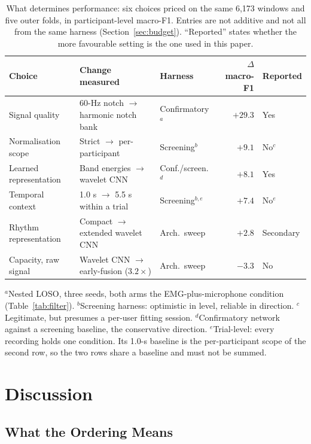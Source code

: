 \documentclass[journal]{IEEEtran}
\begin{document}
\begin{table}[!t]
  \centering
  \caption{What determines performance: six choices priced on the same 6,173 windows and five outer folds, in participant-level macro-F1. Entries are not additive and not all from the same harness (Section~\ref{sec:budget}). ``Reported'' states whether the more favourable setting is the one used in this paper.}
  \label{tab:budget}
  \footnotesize
  \begin{tabular*}{\textwidth}{@{\extracolsep{\fill}}lllrl@{}}
    \toprule
    Choice & Change measured & Harness & $\Delta$ macro-F1 & Reported \\
    \midrule
    Signal quality & 60-Hz notch $\rightarrow$ harmonic notch bank & Confirmatory$^{a}$ & $+29.3$ & Yes \\
    Normalisation scope & Strict $\rightarrow$ per-participant & Screening$^{b}$ & $+9.1$ & No$^{c}$ \\
    Learned representation & Band energies $\rightarrow$ wavelet CNN & Conf./screen.$^{d}$ & $+8.1$ & Yes \\
    Temporal context & 1.0 s $\rightarrow$ 5.5 s within a trial & Screening$^{b,e}$ & $+7.4$ & No$^{e}$ \\
    Rhythm representation & Compact $\rightarrow$ extended wavelet CNN & Arch.\ sweep & $+2.8$ & Secondary \\
    Capacity, raw signal & Wavelet CNN $\rightarrow$ early-fusion ($3.2\times$) & Arch.\ sweep & $-3.3$ & No \\
    \bottomrule
  \end{tabular*}
  \begin{flushleft}\footnotesize
  $^{a}$Nested LOSO, three seeds, both arms the EMG-plus-microphone condition (Table~\ref{tab:filter}). $^{b}$Screening harness: optimistic in level, reliable in direction. $^{c}$Legitimate, but presumes a per-user fitting session. $^{d}$Confirmatory network against a screening baseline, the conservative direction. $^{e}$Trial-level: every recording holds one condition. Its 1.0-s baseline is the per-participant scope of the second row, so the two rows share a baseline and must not be summed.
  \end{flushleft}
\end{table}

\section{Discussion}

\subsection{What the Ordering Means}
\end{document}
